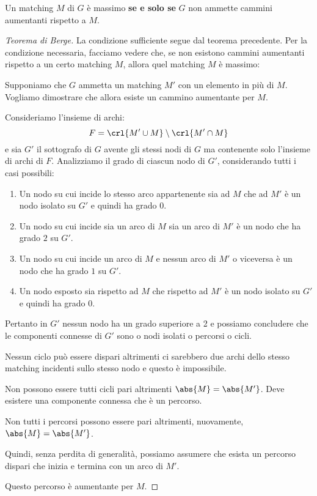 \documentclass[\main/main.tex]{subfiles}
\begin{document}
\begin{theorem}
	Un matching \(M\) di \(G\) è massimo \textbf{se e solo se} \(G\) non ammette cammini aumentanti rispetto a \(M\).
\end{theorem}
\begin{proof}[Teorema di Berge]
	La condizione sufficiente segue dal teorema precedente. Per la condizione necessaria, facciamo vedere che, se non esistono cammini aumentanti rispetto a un certo matching \(M\), allora quel matching \(M\) è massimo:

	Supponiamo che \(G\) ammetta un matching \(M'\) con un elemento in più di \(M\). Vogliamo dimostrare che allora esiste un cammino aumentante per \(M\).

	Consideriamo l'insieme di archi:
	\[
		F = \crl{M'\cup M}\setminus\crl{M' \cap M}
	\]
	e sia \(G'\) il sottografo di \(G\) avente gli stessi nodi di \(G\) ma contenente solo l'insieme di archi di \(F\). Analizziamo il grado di ciascun nodo di \(G'\), considerando tutti i casi possibili:
	\begin{enumerate}
		\item Un nodo su cui incide lo stesso arco appartenente sia ad \(M\) che ad \(M'\) è un nodo isolato su \(G'\) e quindi ha grado 0.
		\item Un nodo su cui incide sia un arco di \(M\) sia un arco di \(M'\) è un nodo che ha grado \(2\) su \(G'\).
		\item Un nodo su cui incide un arco di \(M\) e nessun arco di \(M'\) o viceversa è un nodo che ha grado \(1\) su \(G'\).
		\item Un nodo esposto sia rispetto ad \(M\) che rispetto ad \(M'\) è un nodo isolato su \(G'\) e quindi ha grado 0.
	\end{enumerate}
	Pertanto in \(G'\) nessun nodo ha un grado superiore a 2 e possiamo concludere che le componenti connesse di \(G'\) sono o nodi isolati o percorsi o cicli.

	Nessun ciclo può essere dispari altrimenti ci sarebbero due archi dello stesso matching incidenti sullo stesso nodo e questo è impossibile.

	Non possono essere tutti cicli pari altrimenti \(\abs{M} = \abs{M'}\). Deve esistere una componente connessa che è un percorso.

	Non tutti i percorsi possono essere pari altrimenti, nuovamente, \(\abs{M} = \abs{M'}\).

	Quindi, senza perdita di generalità, possiamo assumere che esista un percorso dispari che inizia e termina con un arco di \(M'\).

	Questo percorso è aumentante per \(M\).
\end{proof}
\end{document}
